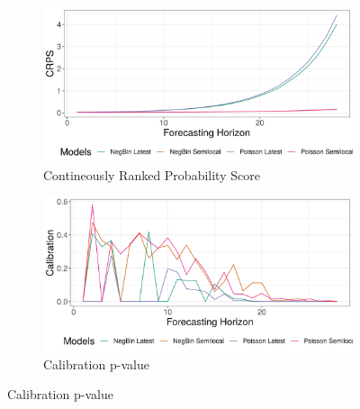 \begin{figure}[H]
\begin{subfigure}{0.5\textwidth}
  \centering
  \includegraphics[width=\linewidth]{../output/Bunia_crps.png}  
  \caption{Contineously Ranked Probability Score}
  \label{fig:sub-first}
\end{subfigure}
\begin{subfigure}{0.5\textwidth}
  \centering
  \includegraphics[width=\linewidth]{../output/Bunia_calibration.png}  
  \caption{Calibration p-value}
  \label{fig:sub-second}
\end{subfigure}


\end{figure}
